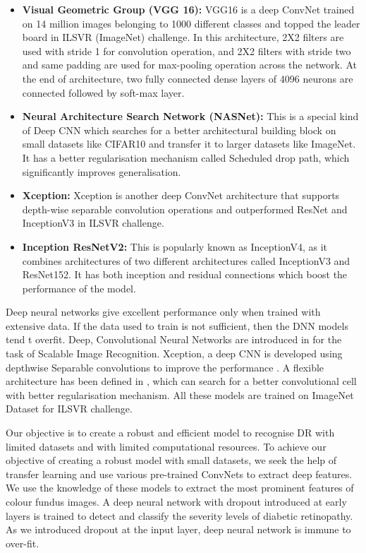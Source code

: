 \documentclass[electronics,article,accept ,moreauthors,pdftex]{mdpi}
\begin{document}
\begin{itemize}
    \item \textbf{Visual Geometric Group (VGG 16):} VGG16 is a deep ConvNet trained on 14 million images belonging to 1000 different classes and topped the leader board in ILSVR (ImageNet) challenge. In this architecture, 2X2 filters are used with stride 1 for convolution operation, and 2X2 filters with stride two and same padding are used for max-pooling operation across the network. At the end of architecture, two fully connected dense layers of 4096 neurons are connected followed by soft-max layer.
    \item \textbf{Neural Architecture Search Network (NASNet): } This is a special kind of Deep CNN which searches for a better architectural building block on small datasets like CIFAR10 and transfer it to larger datasets like ImageNet. It has a better regularisation mechanism called Scheduled drop path, which significantly improves generalisation. 
    
    \item \textbf{Xception: }
    Xception is another deep ConvNet architecture that supports depth-wise separable convolution operations and outperformed ResNet and InceptionV3 in  ILSVR challenge. 
    \item \textbf{Inception ResNetV2:} This is popularly known as InceptionV4, as it combines architectures of two different architectures called InceptionV3 and ResNet152. It has both inception and residual connections which boost the performance of the model. 
\end{itemize}

Deep neural networks give excellent performance only when trained with extensive data. If the data used to train is not sufficient, then the DNN models tend t overfit. Deep, Convolutional Neural Networks are introduced in \cite{simonyan2014very} for the task of Scalable Image Recognition. Xception, a deep CNN is developed using depthwise Separable convolutions to improve the performance \cite{chollet2017xception}. A flexible architecture has been defined in \cite{zoph2018learning}, which can search for a better convolutional cell with better regularisation mechanism. All these models are trained on ImageNet Dataset for ILSVR challenge.

Our objective is to create a robust and efficient model to recognise DR with limited datasets and with limited computational resources. To achieve our objective of creating a robust model with small datasets, we seek the help of transfer learning and use various pre-trained ConvNets to extract deep features.  We use the knowledge of these models to extract the most prominent features of colour fundus images. A deep neural network with dropout introduced at early layers is trained to detect and classify the severity levels of diabetic retinopathy. As we introduced dropout at the input layer, deep neural network is immune to over-fit.
\end{document}
